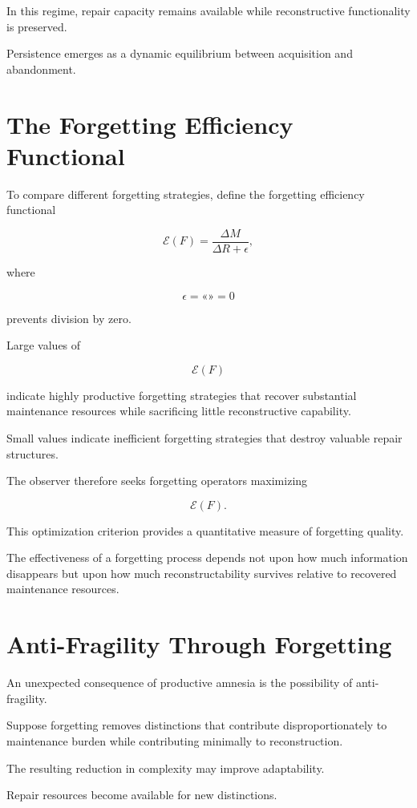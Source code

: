 \documentclass[12pt,oneside]{book}
\theoremstyle{plain} \newtheorem{theorem}{Theorem}[chapter] \newtheorem{lemma}[theorem]{Lemma} \newtheorem{proposition}[theorem]{Proposition} \newtheorem{corollary}[theorem]{Corollary}
\theoremstyle{definition} \newtheorem{definition}[theorem]{Definition} \newtheorem{axiom}[theorem]{Axiom} \newtheorem{construction}[theorem]{Construction}
\theoremstyle{remark} \newtheorem{remark}[theorem]{Remark} \newtheorem{example}[theorem]{Example}
\begin{document}
In this regime, repair capacity remains available while reconstructive functionality is preserved.

Persistence emerges as a dynamic equilibrium between acquisition and abandonment.

\section{The Forgetting Efficiency Functional}

To compare different forgetting strategies, define the forgetting efficiency functional

\[
\mathcal E(F)
=
\frac{\Delta M}
{\Delta R+\epsilon},
\]

where

\[
\epsilon
=
«»
=
0
\]

prevents division by zero.

Large values of

\[
\mathcal E(F)
\]

indicate highly productive forgetting strategies that recover substantial maintenance resources while sacrificing little reconstructive capability.

Small values indicate inefficient forgetting strategies that destroy valuable repair structures.

The observer therefore seeks forgetting operators maximizing

\[
\mathcal E(F).
\]

This optimization criterion provides a quantitative measure of forgetting quality.

The effectiveness of a forgetting process depends not upon how much information disappears but upon how much reconstructability survives relative to recovered maintenance resources.

\section{Anti-Fragility Through Forgetting}

An unexpected consequence of productive amnesia is the possibility of anti-fragility.

Suppose forgetting removes distinctions that contribute disproportionately to maintenance burden while contributing minimally to reconstruction.

The resulting reduction in complexity may improve adaptability.

Repair resources become available for new distinctions.
\end{document}
